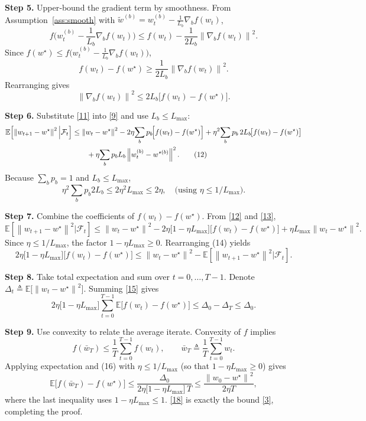 \documentclass{article}
\newcommand{\E}{\mathbb{E}}
\newcommand{\norm}[1]{\left\lVert #1\right\rVert}
\begin{document}
\medskip
\noindent\textbf{Step 5.}  Upper‑bound the gradient term by smoothness.
From Assumption~\ref{ass:smooth} with $\tilde w^{(b)}=w_{t}^{(b)}-\frac{1}{L_{b}}\nabla_{b}f(w_{t})$,
\[
f\bigl(w_{t}^{(b)}-\frac{1}{L_{b}}\nabla_{b}f(w_{t})\bigr)
\le
f(w_{t})-\frac{1}{2L_{b}}\norm{\nabla_{b}f(w_{t})}^{2}.
\]
Since $f(w^{\star})\le f\bigl(w_{t}^{(b)}-\frac{1}{L_{b}}\nabla_{b}f(w_{t})\bigr)$,
\[
f(w_{t})-f(w^{\star})\ge \frac{1}{2L_{b}}\norm{\nabla_{b}f(w_{t})}^{2}.
\tag{10}
\]
Rearranging gives
\[
\norm{\nabla_{b}f(w_{t})}^{2}\le 2L_{b}\bigl[f(w_{t})-f(w^{\star})\bigr].
\tag{11}
\]

\medskip
\noindent\textbf{Step 6.}  Substitute \eqref{11} into \eqref{9} and use
$L_{b}\le L_{\max}$:
\begin{align}
\E\!\left[\norm{w_{t+1}-w^{\star}}^{2}\Big|\mathcal{F}_{t}\right]
&\le \norm{w_{t}-w^{\star}}^{2}
-2\eta\!\sum_{b}p_{b}\!\Bigl[f(w_{t})-f(w^{\star})\Bigr]
+\eta^{2}\!\sum_{b}p_{b}\,2L_{b}\!\bigl[f(w_{t})-f(w^{\star})\bigr]\nonumber\\
&\qquad
+ \eta\!\sum_{b}p_{b}L_{b}\norm{w_{t}^{(b)}-w^{\star (b)}}^{2}. \tag{12}
\end{align}
Because $\sum_{b}p_{b}=1$ and $L_{b}\le L_{\max}$,
\[
\eta^{2}\sum_{b}p_{b}2L_{b}\le 2\eta^{2}L_{\max}\le 2\eta,
\quad\text{(using }\eta\le 1/L_{\max}\text{)}.
\tag{13}
\]

\medskip
\noindent\textbf{Step 7.}  Combine the coefficients of $f(w_{t})-f(w^{\star})$.
From \eqref{12} and \eqref{13},
\[
\E\!\left[\norm{w_{t+1}-w^{\star}}^{2}\Big|\mathcal{F}_{t}\right]
\le \norm{w_{t}-w^{\star}}^{2}
-2\eta\bigl[1-\eta L_{\max}\bigr]\bigl[f(w_{t})-f(w^{\star})\bigr]
+\eta L_{\max}\norm{w_{t}-w^{\star}}^{2}.
\tag{14}
\]
Since $\eta\le 1/L_{\max}$, the factor $1-\eta L_{\max}\ge0$.
Rearranging (14) yields
\[
2\eta\bigl[1-\eta L_{\max}\bigr]\bigl[f(w_{t})-f(w^{\star})\bigr]
\le \norm{w_{t}-w^{\star}}^{2}
-\E\!\left[\norm{w_{t+1}-w^{\star}}^{2}\Big|\mathcal{F}_{t}\right].
\tag{15}
\]

\medskip
\noindent\textbf{Step 8.}  Take total expectation and sum over $t=0,\dots,T-1$.
Denote $\Delta_{t}\triangleq \E\!\bigl[\norm{w_{t}-w^{\star}}^{2}\bigr]$.
Summing \eqref{15} gives
\[
2\eta\bigl[1-\eta L_{\max}\bigr]\sum_{t=0}^{T-1}
\E\!\bigl[f(w_{t})-f(w^{\star})\bigr]
\le \Delta_{0}-\Delta_{T}\le \Delta_{0}.
\tag{16}
\]

\medskip
\noindent\textbf{Step 9.}  Use convexity to relate the average iterate.
Convexity of $f$ implies
\[
f(\bar w_{T})\le \frac{1}{T}\sum_{t=0}^{T-1}f(w_{t}),
\qquad
\bar w_{T}\triangleq\frac{1}{T}\sum_{t=0}^{T-1}w_{t}.
\tag{17}
\]
Applying expectation and (16) with $\eta\le 1/L_{\max}$ (so that $1-\eta L_{\max}\ge 0$)
gives
\[
\E\!\bigl[f(\bar w_{T})-f(w^{\star})\bigr]
\le \frac{\Delta_{0}}{2\eta\bigl[1-\eta L_{\max}\bigr]\,T}
\le \frac{\norm{w_{0}-w^{\star}}^{2}}{2\eta T},
\tag{18}
\]
where the last inequality uses $1-\eta L_{\max}\le 1$.
\eqref{18} is exactly the bound \eqref{3}, completing the proof.
\hfill\qedsymbol
\end{document}
